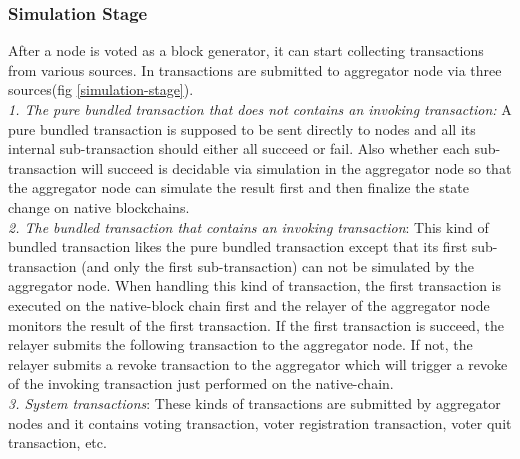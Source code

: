 \documentclass[pageno]{jpaper}
\begin{document}
\subsubsection{Simulation Stage}
After a node is voted as a block generator, it can start collecting transactions from various sources. In \dprotocol transactions are submitted to aggregator node via three sources(fig \ref{simulation-stage}).\\
\newline
\textit{1. The pure bundled transaction that does not contains an invoking transaction:} A pure bundled transaction is supposed to be sent directly to \dprotocol nodes and all its internal sub-transaction should either all succeed or fail. Also whether each sub-transaction will succeed is decidable via simulation in the aggregator node so that the aggregator node can simulate the result first and then finalize the state change on native blockchains.\\
\newline
\textit{2. The bundled transaction that contains an invoking transaction}: This kind of bundled transaction likes the pure bundled transaction except that its first sub-transaction (and only the first sub-transaction) can not be simulated by the aggregator node. When handling this kind of transaction, the first transaction is executed on the native-block chain first and the relayer of the aggregator node monitors the result of the first transaction. If the first transaction is succeed, the relayer submits the following transaction to the aggregator node. If not, the relayer submits a revoke transaction to the aggregator which will trigger a revoke of the invoking transaction just performed on the native-chain.\\
\newline
\textit{3. System transactions}: These kinds of transactions are submitted by aggregator nodes and it contains voting transaction, voter registration transaction, voter quit transaction, etc.
\end{document}
